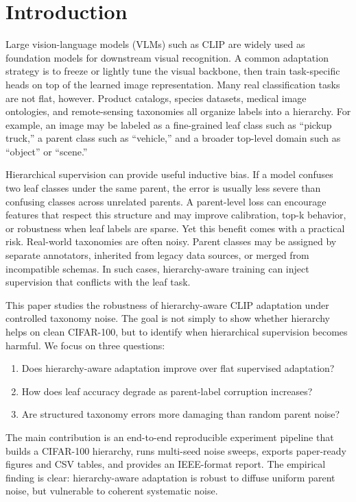 \documentclass[conference]{IEEEtran}
\begin{document}
\section{Introduction}
Large vision-language models (VLMs) such as CLIP are widely used as foundation
models for downstream visual recognition. A common adaptation strategy is to
freeze or lightly tune the visual backbone, then train task-specific heads on
top of the learned image representation. Many real classification tasks are
not flat, however. Product catalogs, species datasets, medical image
ontologies, and remote-sensing taxonomies all organize labels into a hierarchy.
For example, an image may be labeled as a fine-grained leaf class such as
``pickup truck,'' a parent class such as ``vehicle,'' and a broader top-level
domain such as ``object'' or ``scene.''

Hierarchical supervision can provide useful inductive bias. If a model
confuses two leaf classes under the same parent, the error is usually less
severe than confusing classes across unrelated parents. A parent-level loss can
encourage features that respect this structure and may improve calibration,
top-k behavior, or robustness when leaf labels are sparse. Yet this benefit
comes with a practical risk. Real-world taxonomies are often noisy. Parent
classes may be assigned by separate annotators, inherited from legacy data
sources, or merged from incompatible schemas. In such cases, hierarchy-aware
training can inject supervision that conflicts with the leaf task.

This paper studies the robustness of hierarchy-aware CLIP adaptation under
controlled taxonomy noise. The goal is not simply to show whether hierarchy
helps on clean CIFAR-100, but to identify when hierarchical supervision becomes
harmful. We focus on three questions:
\begin{enumerate}
\item Does hierarchy-aware adaptation improve over flat supervised adaptation?
\item How does leaf accuracy degrade as parent-label corruption increases?
\item Are structured taxonomy errors more damaging than random parent noise?
\end{enumerate}

The main contribution is an end-to-end reproducible experiment pipeline that
builds a CIFAR-100 hierarchy, runs multi-seed noise sweeps, exports paper-ready
figures and CSV tables, and provides an IEEE-format report. The empirical
finding is clear: hierarchy-aware adaptation is robust to diffuse uniform
parent noise, but vulnerable to coherent systematic noise.
\end{document}
